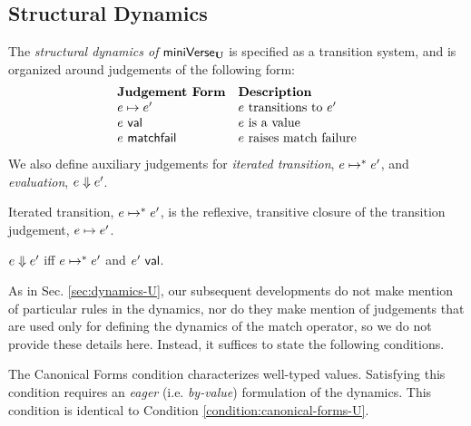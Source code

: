 {{{{\subsection{Structural Dynamics}\label{sec:dynamics-UP}
The \emph{structural dynamics of }$\mathsf{miniVerse}_\textbf{U}$ is specified as a transition system, and is organized around judgements of the following form:
\[\begin{array}{ll}
\textbf{Judgement Form} & \textbf{Description}\\
e \mapsto e' & \text{$e$ transitions to $e'$}\\
e~\mathsf{val} & \text{$e$ is a value}\\
e~\mathsf{matchfail} & \text{$e$ raises match failure}
\end{array}\]
We also define auxiliary judgements for \emph{iterated transition}, $e \mapsto^{*} e'$, and \emph{evaluation}, $e \Downarrow e'$.

\begin{definition}\label{defn:iterated-transition-UP} Iterated transition, $e \mapsto^{*} e'$, is the reflexive, transitive closure of the transition judgement, $e \mapsto e'$.\end{definition}

\begin{definition}[Evaluation]\label{defn:evaluation-UP}  $e \Downarrow e'$ iff $e \mapsto^{*} e'$ and $e'~\mathsf{val}$. \end{definition}

As in Sec. \ref{sec:dynamics-U}, our subsequent developments do not make mention of particular rules in the dynamics, nor do they make mention of judgements that are used only for defining the dynamics of the match operator, so we do not provide these details here. Instead, it suffices to state the following conditions.

The Canonical Forms condition characterizes well-typed values. Satisfying this condition requires an \emph{eager} (i.e. \emph{by-value}) formulation of the dynamics. This condition is identical to Condition \ref{condition:canonical-forms-U}.

}}}}

